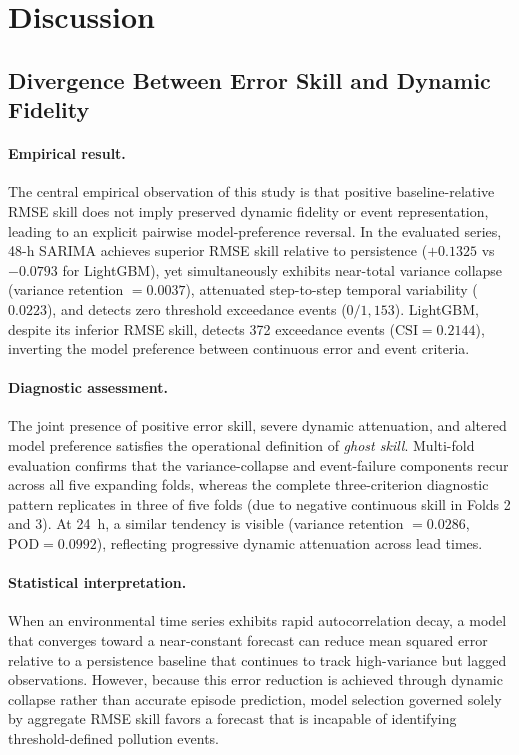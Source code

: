 \documentclass[12pt]{article}
\begin{document}
\section{Discussion}
\label{sec:discussion}

\subsection{Divergence Between Error Skill and Dynamic Fidelity}
\label{sec:disc_main}

\paragraph{Empirical result.}
The central empirical observation of this study is that positive baseline-relative RMSE skill does not imply preserved dynamic fidelity or event representation, leading to an explicit pairwise model-preference reversal. In the evaluated series, 48-h SARIMA achieves superior RMSE skill relative to persistence ($+0.1325$ vs $-0.0793$ for LightGBM), yet simultaneously exhibits near-total variance collapse (variance retention $= 0.0037$), attenuated step-to-step temporal variability ($0.0223$), and detects zero threshold exceedance events ($0/1,153$). LightGBM, despite its inferior RMSE skill, detects 372 exceedance events ($\mathrm{CSI} = 0.2144$), inverting the model preference between continuous error and event criteria.

\paragraph{Diagnostic assessment.}
The joint presence of positive error skill, severe dynamic attenuation, and altered model preference satisfies the operational definition of \emph{ghost skill}. Multi-fold evaluation confirms that the variance-collapse and event-failure components recur across all five expanding folds, whereas the complete three-criterion diagnostic pattern replicates in three of five folds (due to negative continuous skill in Folds 2 and 3). At 24~h, a similar tendency is visible (variance retention $= 0.0286$, $\mathrm{POD} = 0.0992$), reflecting progressive dynamic attenuation across lead times.

\paragraph{Statistical interpretation.}
When an environmental time series exhibits rapid autocorrelation decay, a model that converges toward a near-constant forecast can reduce mean squared error relative to a persistence baseline that continues to track high-variance but lagged observations. However, because this error reduction is achieved through dynamic collapse rather than accurate episode prediction, model selection governed solely by aggregate RMSE skill favors a forecast that is incapable of identifying threshold-defined pollution events.
\end{document}
